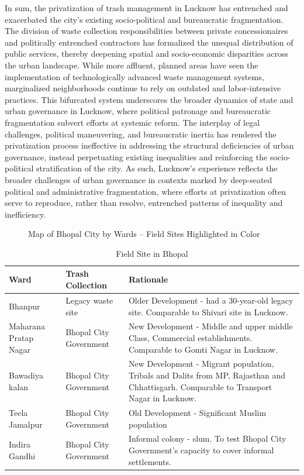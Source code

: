In sum, the privatization of trash management in Lucknow has entrenched and exacerbated the city's existing socio-political and bureaucratic fragmentation. The division of waste collection responsibilities between private concessionaires and politically entrenched contractors has formalized the unequal distribution of public services, thereby deepening spatial and socio-economic disparities across the urban landscape. While more affluent, planned areas have seen the implementation of technologically advanced waste management systems, marginalized neighborhoods continue to rely on outdated and labor-intensive practices. This bifurcated system underscores the broader dynamics of state and urban governance in Lucknow, where political patronage and bureaucratic fragmentation subvert efforts at systemic reform. The interplay of legal challenges, political maneuvering, and bureaucratic inertia has rendered the privatization process ineffective in addressing the structural deficiencies of urban governance, instead perpetuating existing inequalities and reinforcing the socio-political stratification of the city. As such, Lucknow's experience reflects the broader challenges of urban governance in contexts marked by deep-seated political and administrative fragmentation, where efforts at privatization often serve to reproduce, rather than resolve, entrenched patterns of inequality and inefficiency.

\begin{figure}[ht]
\centering
\caption{Map of Bhopal City by Wards – Field Sites Highlighted in Color}
\label{fig:bhopal_map}
\end{figure}

\begin{table}[ht]
\centering
\caption{Field Site in Bhopal}
\label{tab:field_sites_bhopal}
\begin{tabular}{|p{3cm}|p{4cm}|p{6cm}|}
\hline
\textbf{Ward} & \textbf{Trash Collection} & \textbf{Rationale} \\
\hline
Bhanpur & Legacy waste site & Older Development - had a 30-year-old legacy site. Comparable to Shivari site in Lucknow. \\
\hline
Maharana Pratap Nagar & Bhopal City Government & New Development - Middle and upper middle Class, Commercial establishments. Comparable to Gomti Nagar in Lucknow. \\
\hline
Bawadiya kalan & Bhopal City Government & New Development - Migrant population, Tribals and Dalits from MP, Rajasthan and Chhattisgarh. Comparable to Transport Nagar in Lucknow. \\
\hline
Teela Jamalpur & Bhopal City Government & Old Development - Significant Muslim population \\
\hline
Indira Gandhi & Bhopal City Government & Informal colony - slum. To test Bhopal City Government's capacity to cover informal settlements. \\
\hline
\end{tabular}
\end{table}

